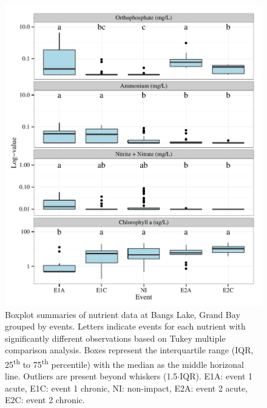 \documentclass[letterpaper,12pt]{article}\usepackage[]{graphicx}\usepackage[]{color}
\makeatletter
\def\maxwidth{ %
  \ifdim\Gin@nat@width>\linewidth
    \linewidth
  \else
    \Gin@nat@width
  \fi
}
\makeatother
\begin{document}
\begin{figure}[!ht]

{\centering \includegraphics[width=\maxwidth]{figs/tukey-1} 

}

\caption[Boxplot summaries of nutrient data at Bangs Lake, Grand Bay grouped by events]{Boxplot summaries of nutrient data at Bangs Lake, Grand Bay grouped by events.  Letters indicate events for each nutrient with significantly different observations based on Tukey multiple comparison analysis.  Boxes represent the interquartile range (IQR, 25\textsuperscript{th} to 75\textsuperscript{th} percentile) with the median as the middle horizonal line.  Outliers are present beyond whiskers (1.5$\cdot$IQR). E1A: event 1 acute, E1C: event 1 chronic, NI: non-impact, E2A: event 2 acute, E2C: event 2 chronic.}\label{fig:tukey}
\end{figure}


\clearpage
\end{document}
